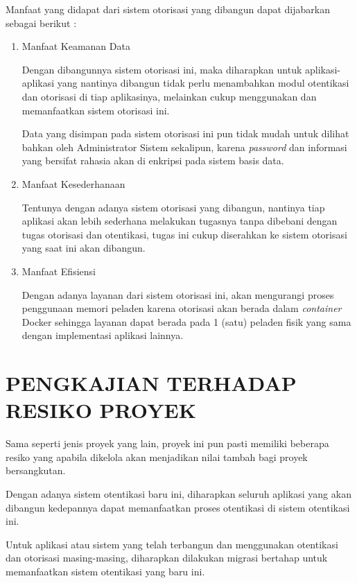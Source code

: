 \documentclass[pdftex,12pt, oneside]{article}
\begin{document}
\begin{enumerate}
Manfaat yang didapat dari sistem otorisasi yang dibangun dapat dijabarkan sebagai berikut :

\begin{enumerate}
	\item Manfaat Keamanan Data
	
Dengan dibangunnya sistem otorisasi ini, maka diharapkan untuk aplikasi-aplikasi yang nantinya dibangun tidak perlu menambahkan modul otentikasi dan otorisasi di tiap aplikasinya, melainkan cukup menggunakan dan memanfaatkan sistem otorisasi ini. 

Data yang disimpan pada sistem otorisasi ini pun tidak mudah untuk dilihat bahkan oleh Administrator Sistem sekalipun, karena \textit{password} dan informasi yang bersifat rahasia akan di enkripsi pada sistem basis data.
		
	\item Manfaat Kesederhanaan
	
Tentunya dengan adanya sistem otorisasi yang dibangun, nantinya tiap aplikasi akan lebih sederhana melakukan tugasnya tanpa dibebani dengan tugas otorisasi dan otentikasi, tugas ini cukup diserahkan ke sistem otorisasi yang saat ini akan dibangun.
	
	\item Manfaat Efisiensi
	
Dengan adanya layanan dari sistem otorisasi ini, akan mengurangi proses penggunaan memori peladen karena otorisasi akan berada dalam \textit{container} Docker sehingga layanan dapat berada pada 1 (satu) peladen fisik yang sama dengan implementasi aplikasi lainnya.
	
\end{enumerate}	
	
\end{enumerate}

\section{PENGKAJIAN TERHADAP RESIKO PROYEK}

Sama seperti jenis proyek yang lain, proyek ini pun pasti memiliki beberapa resiko yang apabila dikelola akan menjadikan nilai tambah bagi proyek bersangkutan. 

Dengan adanya sistem otentikasi baru ini, diharapkan seluruh aplikasi yang akan dibangun kedepannya dapat memanfaatkan proses otentikasi di sistem otentikasi ini.

Untuk aplikasi atau sistem yang telah terbangun dan menggunakan otentikasi dan otorisasi masing-masing, diharapkan dilakukan migrasi bertahap untuk memanfaatkan sistem otentikasi yang baru ini.
\end{document}
